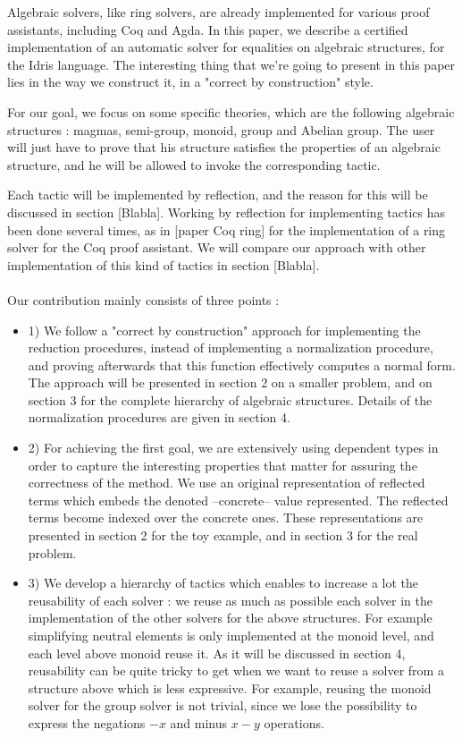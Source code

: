 Algebraic solvers, like ring solvers, are already implemented for various proof assistants, including Coq and Agda. In this paper, we describe a certified implementation of an automatic solver for equalities on algebraic structures, for the Idris language. The interesting thing that we're going to present in this paper lies in the way we construct it, in a "correct by construction" style.

For our goal, we focus on some specific theories, which are the following algebraic structures : magmas, semi-group, monoid, group and Abelian group.
The user will just have to prove that his structure satisfies the properties of an algebraic structure, and he will be allowed to invoke the corresponding tactic.

Each tactic will be implemented by reflection, and the reason for this will be discussed in section [Blabla]. Working by reflection for implementing tactics has been done several times, as in [paper Coq ring] for the implementation of a ring solver for the Coq proof assistant. We will compare our approach with other implementation of this kind of tactics in section [Blabla]. \\
\\
Our contribution mainly consists of three points :
\begin{itemize}
	\item 1) We follow a "correct by construction" approach for implementing the reduction procedures, instead of implementing a normalization procedure, and proving afterwards that this function effectively computes a normal form. The approach will be presented in section 2 on a smaller problem, and on section 3 for the complete hierarchy of algebraic structures. Details of the normalization procedures are given in section 4.
	\item 2) For achieving the first goal, we are extensively using dependent types in order to capture the interesting properties that matter for assuring the correctness of the method. We use an original representation of reflected terms which embeds the denoted --concrete-- value represented. The reflected terms become indexed over the concrete ones. These representations are presented in section 2 for the toy example, and in section 3 for the real problem.
	\item 3) We develop a hierarchy of tactics which enables to increase a lot the reusability of each solver : we reuse as much as possible each solver in the implementation of the other solvers for the above structures. For example simplifying neutral elements is only implemented at the monoid level, and each level above monoid reuse it. As it will be discussed in section 4, reusability can be quite tricky to get when we want to reuse a solver from a structure above which is less expressive. For example, reusing the monoid solver for the group solver is not trivial, since we lose the possibility to express the negations $-x$ and minus $x-y$ operations.
\end{itemize}